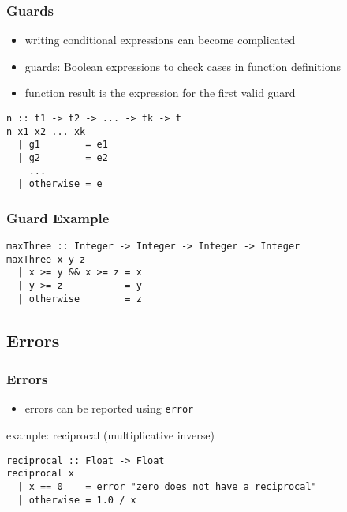 \documentclass[dvipsnames]{beamer}
\theoremstyle{plain}
\begin{document}
\begin{frame}[fragile]
  \frametitle{Guards}

  \begin{itemize}
    \item writing conditional expressions can become complicated
    \item \alert{guards}: Boolean expressions to check cases
      in function definitions
    \item function result is the expression for the first valid guard
  \end{itemize}

  \begin{block}{}
    \begin{lstlisting}
n :: t1 -> t2 -> ... -> tk -> t
n x1 x2 ... xk
  | g1        = e1
  | g2        = e2
    ...
  | otherwise = e
    \end{lstlisting}
  \end{block}
\end{frame}

\begin{frame}[fragile]
  \frametitle{Guard Example}

  \begin{lstlisting}
maxThree :: Integer -> Integer -> Integer -> Integer
maxThree x y z
  | x >= y && x >= z = x
  | y >= z           = y
  | otherwise        = z
  \end{lstlisting}
\end{frame}

\subsection{Errors}

\begin{frame}[fragile]
  \frametitle{Errors}

  \begin{itemize}
    \item errors can be reported using \lstinline{error}
  \end{itemize}

  \begin{exampleblock}{example: reciprocal (multiplicative inverse)}
    \begin{lstlisting}
reciprocal :: Float -> Float
reciprocal x
  | x == 0    = error "zero does not have a reciprocal"
  | otherwise = 1.0 / x
    \end{lstlisting}
  \end{exampleblock}
\end{frame}
\end{document}
